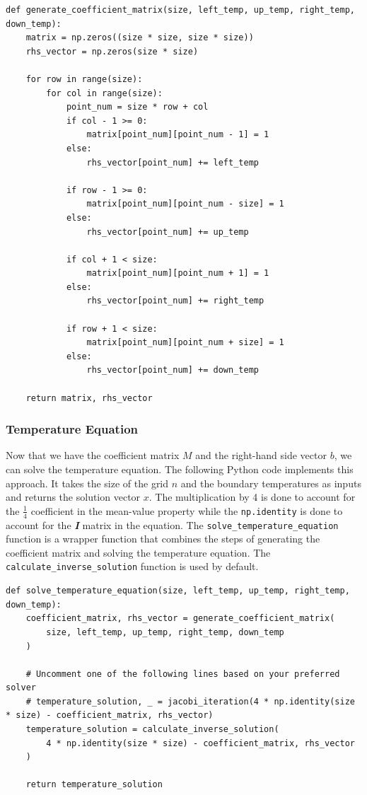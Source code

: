 \documentclass{article}
\begin{document}
\begin{lstlisting}[style=Python]
def generate_coefficient_matrix(size, left_temp, up_temp, right_temp, down_temp):
    matrix = np.zeros((size * size, size * size))
    rhs_vector = np.zeros(size * size)

    for row in range(size):
        for col in range(size):
            point_num = size * row + col
            if col - 1 >= 0:
                matrix[point_num][point_num - 1] = 1
            else:
                rhs_vector[point_num] += left_temp

            if row - 1 >= 0:
                matrix[point_num][point_num - size] = 1
            else:
                rhs_vector[point_num] += up_temp

            if col + 1 < size:
                matrix[point_num][point_num + 1] = 1
            else:
                rhs_vector[point_num] += right_temp

            if row + 1 < size:
                matrix[point_num][point_num + size] = 1
            else:
                rhs_vector[point_num] += down_temp

    return matrix, rhs_vector
\end{lstlisting}

\begin{multicols}{2}
\subsubsection{Temperature Equation}
Now that we have the coefficient matrix $M$ and the right-hand side vector $b$,
we can solve the temperature equation. The following Python code implements this
approach. It takes the size of the grid $n$ and the boundary temperatures as
inputs and returns the solution vector $x$. The multiplication by 4 is done to
account for the \(\frac{1}{4}\) coefficient in the mean-value property while the
\texttt{np.identity} is done to account for the \textbf{\textit{I}} matrix in
the equation. The \texttt{solve\_temperature\_equation} function is a wrapper
function that combines the steps of generating the coefficient matrix and
solving the temperature equation. The \texttt{calculate\_inverse\_solution}
function is used by default.
\end{multicols}

\begin{lstlisting}[style=Python]
def solve_temperature_equation(size, left_temp, up_temp, right_temp, down_temp):
    coefficient_matrix, rhs_vector = generate_coefficient_matrix(
        size, left_temp, up_temp, right_temp, down_temp
    )

    # Uncomment one of the following lines based on your preferred solver
    # temperature_solution, _ = jacobi_iteration(4 * np.identity(size * size) - coefficient_matrix, rhs_vector)
    temperature_solution = calculate_inverse_solution(
        4 * np.identity(size * size) - coefficient_matrix, rhs_vector
    )

    return temperature_solution
\end{lstlisting}
\end{document}
